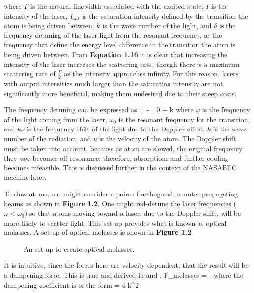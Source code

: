 where $\Gamma$ is the natural linewidth associated with the excited state, $I$ is the intensity of the laser, $I_{sat}$ is the saturation intensity defined by the transition the atom is being driven between, $k$ is the wave number of the light, and $\delta$ is the frequency detuning of the laser light from the resonant frequency, or the frequency that define the energy level difference in the transition the atom is being driven between. From \textbf{Equation 1.16} it is clear that increasing the intensity of the laser increases the scattering rate, though there is a maximum scattering rate of $\frac{\Gamma}{2}$ as the intensity approaches infinity. For this reason, lasers with output intensities much larger than the saturation intensity are not significantly more beneficial, making them undesired due to their steep costs. 


The frequency detuning can be expressed as
\beq
\delta = \omega - \omega_0 + k \nu
\eeq
where $\omega$ is the frequency of the light coming from the laser, $\omega_0$ is the resonant frequency for the transition, and $k\nu$ is the frequency shift of the light due to the Doppler effect. $k$ is the wave-number of the radiation, and $\nu$ is the velocity of the atom. The Doppler shift must be taken into account, because as atom are slowed, the original frequency they saw becomes off resonance; therefore, absorptions and further cooling becomes infeasible. This is discussed further in the context of the NASABEC machine later.  


To slow atoms, one might consider a pairs of orthogonal, counter-propagating beams as shown in \textbf{Figure 1.2}. One might red-detune the laser frequencies ($\omega < \omega_0$) so that atoms moving toward a laser, due to the Doppler shift, will be more likely to scatter light. This set up provides what is known as optical molasses. A set up of optical molasses is shown in \textbf{Figure 1.2}


\begin{figure}[h!]
\begin{center}
\end{center}
\caption{An set up to create optical molasses.\cite{foot} }
\end{figure}

It is intuitive, since the forces here are velocity dependent, that the result will be a dampening force. This is true and derived in \cite{foot} and \cite{metcalf_article}.
\beq
F_{molasses} = -\beta \nu
\eeq
where the dampening coefficient is of the form
\beq
\beta = 4 \hbar k^2  
\eeq

